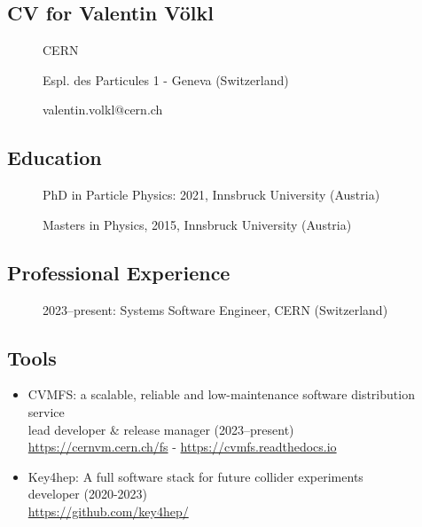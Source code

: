 
\subsection{CV for Valentin V\"olkl}
\begin{description}
\item[] CERN
\item[] Espl. des Particules 1 - Geneva (Switzerland)
\item[] valentin.volkl@cern.ch
\end{description}

\subsection*{Education}
\begin{description}
    \item[] PhD in Particle Physics: 2021, Innsbruck University (Austria)
    \item[] Masters in Physics, 2015, Innsbruck University (Austria)
\end{description}

\subsection*{Professional Experience}
\begin{description}
    \item[] 2023--present: Systems Software Engineer, CERN (Switzerland)
\end{description}

\subsection*{Tools}

\begin{itemize}
    \item[] CVMFS: a scalable, reliable and low-maintenance software distribution service
    \\lead developer \& release manager (2023--present)
    \\{\small{\url{https://cernvm.cern.ch/fs} - \url{https://cvmfs.readthedocs.io}}}
    \item[] Key4hep: A full software stack for future collider experiments\\developer (2020-2023)\\{\small{ \url{https://github.com/key4hep/}}}
\end{itemize}

